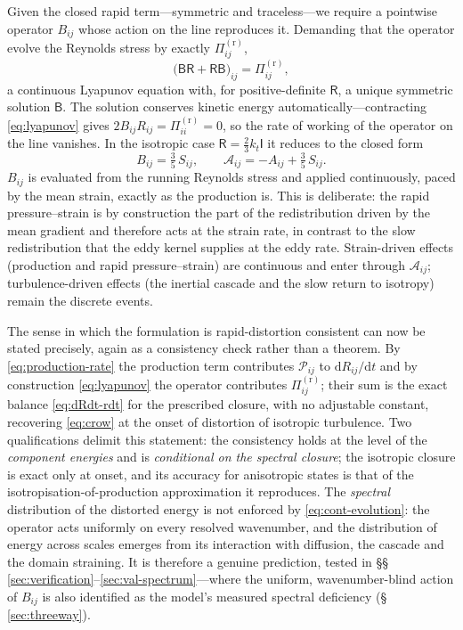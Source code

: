 \documentclass[lineno]{JFM-FLM_Au}
\begin{document}
Given the closed rapid term---symmetric and traceless---we require a
pointwise operator $B_{ij}$ whose action on the line reproduces it.
Demanding that the operator evolve the Reynolds stress by exactly
$\Pi^{(\mathrm r)}_{ij}$,
\begin{equation}
  \big(\mathsf{B}\mathsf{R}+\mathsf{R}\mathsf{B}\big)_{ij}
  = \Pi^{(\mathrm r)}_{ij},
  \label{eq:lyapunov}
\end{equation}
a continuous Lyapunov equation with, for positive-definite
$\mathsf{R}$, a unique symmetric solution $\mathsf{B}$. The solution
conserves kinetic energy automatically---contracting \eqref{eq:lyapunov}
gives $2B_{ij}R_{ij}=\Pi^{(\mathrm r)}_{ii}=0$, so the rate of working of
the operator on the line vanishes. In the isotropic case
$\mathsf{R}=\tfrac23k_t\mathsf{I}$ it reduces to the closed form
\begin{equation}
  B_{ij} = \tfrac{3}{5}\,S_{ij},
  \qquad
  \mathcal{A}_{ij} = -A_{ij} + \tfrac{3}{5}\,S_{ij}.
  \label{eq:iso-B}
\end{equation}
$B_{ij}$ is evaluated from the running Reynolds stress and applied
continuously, paced by the mean strain, exactly as the production is.
This is deliberate: the rapid pressure--strain is by construction the
part of the redistribution driven by the mean gradient and therefore acts
at the strain rate, in contrast to the slow redistribution that the eddy
kernel supplies at the eddy rate. Strain-driven effects (production and
rapid pressure--strain) are continuous and enter through
$\mathcal{A}_{ij}$; turbulence-driven effects (the inertial cascade and
the slow return to isotropy) remain the discrete events.

The sense in which the formulation is rapid-distortion consistent can now
be stated precisely, again as a consistency check rather than a theorem.
By \eqref{eq:production-rate} the production term contributes
$\mathcal{P}_{ij}$ to $\mathrm{d}R_{ij}/\mathrm{d}t$ and by construction
\eqref{eq:lyapunov} the operator contributes $\Pi^{(\mathrm r)}_{ij}$;
their sum is the exact balance \eqref{eq:dRdt-rdt} for the prescribed
closure, with no adjustable constant, recovering \eqref{eq:crow} at the
onset of distortion of isotropic turbulence. Two qualifications delimit
this statement: the consistency holds at the level of the
\emph{component energies} and is \emph{conditional on the
spectral closure}; the isotropic closure is exact only at onset, and its
accuracy for anisotropic states is that of the
isotropisation-of-production approximation it reproduces. The
\emph{spectral} distribution of the distorted energy is not enforced by
\eqref{eq:cont-evolution}: the operator acts uniformly on every resolved
wavenumber, and the distribution of energy across scales emerges from
its interaction with diffusion, the cascade and the domain straining. It
is therefore a genuine prediction, tested in
\S\S\,\ref{sec:verification}--\ref{sec:val-spectrum}---where the
uniform, wavenumber-blind action of $B_{ij}$ is also identified as the
model's measured spectral deficiency (\S\,\ref{sec:threeway}).
\end{document}
